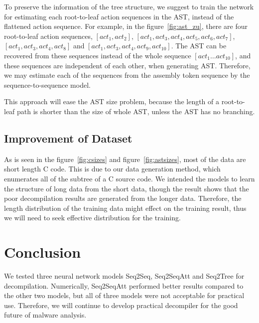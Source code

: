 \documentclass[senior,final,11pt]{iscs-thesis}
\begin{document}
To preserve the information of the tree structure, we suggest to train the network for estimating each root-to-leaf action sequences in the AST,
instead of the flattened action sequence. 
For example, in the figure~\ref{fig:ast_zu}, there are four root-to-leaf action sequences, 
$ [act_1, act_2] $, $ [act_1, act_3,act_4,act_5,act_6,act_7] $, $ [act_1, act_3,act_4,act_8] $ and $ [act_1, act_3,act_4,act_9,act_{10}] $.
The AST can be recovered from these sequences instead of the whole sequence $ [act_1 \dots act_{10}] $, 
and these sequences are independent of each other, when generating AST.
Therefore, we may estimate each of the sequences from the assembly token sequence by the sequence-to-sequence model.

This approach will ease the AST size problem, because the length of a root-to-leaf path is shorter than the size of whole AST, unless the AST has no branching.







\section{Improvement of Dataset}
As is seen in the figure~\ref{fig:csizes} and figure~\ref{fig:astsizes}, most of the data are short length C code.
This is due to our data generation method, which enumerates all of the subtree of a C source code.
We intended the models to learn the structure of long data from the short data, though the result shows that 
the poor decompilation results are generated from the longer data.
Therefore, the length distribution of the training data might effect on the training result, 
thus we will need to seek effective distribution for the training.





\chapter{Conclusion}
We tested three neural network models Seq2Seq, Seq2SeqAtt and Seq2Tree for decompilation.
Numerically, Seq2SeqAtt performed better results compared to the other two models,
but all of three models were not acceptable for practical use.
Therefore, we will continue to develop practical decompiler for the good future of malware analysis.
\end{document}
